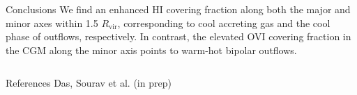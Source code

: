 \documentclass{beamer}
\begin{document}
\begin{frame}
\begin{columns}
\begin{column}{0.99\textwidth}
      \begin{block}{Conclusions}
          We find an enhanced HI covering fraction along both the major and minor axes within 1.5 $R_{\text{vir}}$, corresponding to cool accreting gas and the cool phase of outflows, respectively. In contrast, the elevated OVI covering fraction in the CGM along the minor axis points to warm-hot bipolar outflows.
      \end{block}
    \end{column}
  \end{columns}
  \begin{columns}
    \begin{column}{0.99\textwidth}
      \begin{block}{References}
        \printbibliography[title = {References}]
         \noindent \footnotesize{Das, Sourav et al. (in prep)} \\
      \end{block}
    \end{column}
  \end{columns}
\end{frame}
\end{document}
